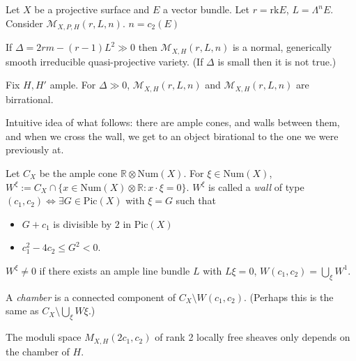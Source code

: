 Let $X$ be a projective surface and $E$ a vector bundle. 
Let $r = \text{rk} E$, $L = \Lambda^{n}E$. Consider
$\mathcal{M}_{X,P,H}(r,L,n)$.
$n=c_2(E)$ 

\begin{theorem}
\label{theorem-moduli-space-that-is-normal-generaically-smooth-irreducible-
quasi-projective-variety}
If $\Delta=2rm-(r-1)L^2 \gg 0$ then $\mathcal{M}_{X,H}(r,L,n)$ is a normal,
generically smooth irreducible quasi-projective variety. (If $\Delta$ is small
then it is not true.)
\end{theorem}

\begin{theorem}
\label{theorem-birrational-moduli-spaces}
Fix $H,H'$ ample. For $\Delta \gg 0$, $\mathcal{M}_{X,H}(r,L,n)$ and
$\mathcal{M}_{X,H}(r,L,n)$ are birrational.
\end{theorem}

\medskip\noindent
Intuitive idea of what follows: there are ample cones, and walls between them, 
and when we cross the
wall, we get to an object birational to the one we were previously at.

\begin{definition}
\label{definition-wall}
Let $C_X$ be the ample cone $\mathbb{R} \otimes \text{Num}(X)$. For 
$\xi \in\text{Num}(X)$, 
$W^\xi:=C_X \cap \{x \in \text{Num}(X) \otimes\mathbb{R}:x\cdot\xi=0\}$. 
$W^\xi$ is called a {\it wall} of type 
$(c_1,c_2) \iff \exists G \in\text{Pic}(X)$ with $\xi = G$ such that 
\begin{itemize}
\item $G+c_1$ is divisible by $2$ in $\text{Pic}(X)$
\item $c_1^2-4c_2 \leq G^2 <0$.
\end{itemize}
\end{definition}

\begin{remark}
\label{remark-wall-not-zero-if-exists-ample-with-condition}
$W^\xi \neq 0$ if there exists an ample line bundle $L$ with $L\xi =0$,
$W(c_1,c_2)=\bigcup_{\xi}W^1$.
\end{remark}

\begin{definition}
\label{definition-chamber}
A {\it chamber} is a connected component of $C_X\setminus W(c_1,c_2)$. (Perhaps
this is the same as $C_X \setminus \bigcup_{\xi}W\xi$.)
\end{definition}

\begin{theorem}[Qin]
\label{theorem-Qin}
The moduli space $M_{X,H}(2c_1,c_2)$ of rank 2 locally free sheaves only depends
on the chamber of $H$.
\end{theorem}

